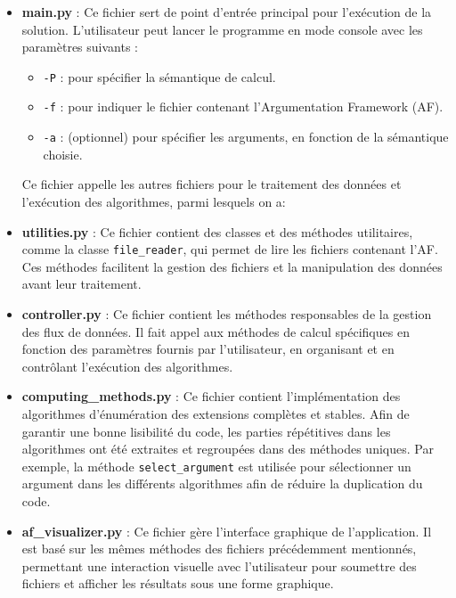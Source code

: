 \documentclass{rapportECL}
\begin{document}
\begin{itemize}
    \item \textbf{main.py} : Ce fichier sert de point d'entrée principal pour l'exécution de la solution. L'utilisateur peut lancer le programme en mode console avec les paramètres suivants :
    \begin{itemize}
        \item \texttt{-P} : pour spécifier la sémantique de calcul.
        \item \texttt{-f} : pour indiquer le fichier contenant l'Argumentation Framework (AF).
        \item \texttt{-a} : (optionnel) pour spécifier les arguments, en fonction de la sémantique choisie.
    \end{itemize}
    Ce fichier appelle les autres fichiers pour le traitement des données et l'exécution des algorithmes, parmi lesquels on a:

    \item \textbf{utilities.py} : Ce fichier contient des classes et des méthodes utilitaires, comme la classe \texttt{file\_reader}, qui permet de lire les fichiers contenant l'AF. Ces méthodes facilitent la gestion des fichiers et la manipulation des données avant leur traitement.

    \item \textbf{controller.py} : Ce fichier contient les méthodes responsables de la gestion des flux de données. Il fait appel aux méthodes de calcul spécifiques en fonction des paramètres fournis par l'utilisateur, en organisant et en contrôlant l'exécution des algorithmes.

    \item \textbf{computing\_methods.py} : Ce fichier contient l'implémentation des algorithmes d'énumération des extensions complètes et stables. Afin de garantir une bonne lisibilité du code, les parties répétitives dans les algorithmes ont été extraites et regroupées dans des méthodes uniques. Par exemple, la méthode \texttt{select\_argument} est utilisée pour sélectionner un argument dans les différents algorithmes afin de réduire la duplication du code.

    \item \textbf{af\_visualizer.py} : Ce fichier gère l'interface graphique de l'application. Il est basé sur les mêmes méthodes des fichiers précédemment mentionnés, permettant une interaction visuelle avec l'utilisateur pour soumettre des fichiers et afficher les résultats sous une forme graphique.

\end{itemize}
\end{document}
